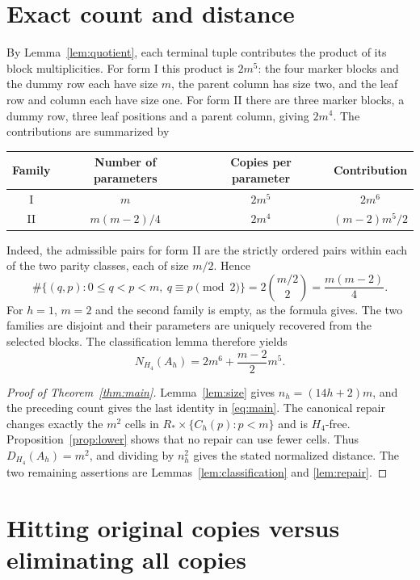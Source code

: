 \documentclass[11pt]{article}
\newcommand{\Copy}{N_{H_4}}
\begin{document}
\section{Exact count and distance}\label{sec:count}
By Lemma~\ref{lem:quotient}, each terminal tuple contributes the product of
its block multiplicities. For form I this product is $2m^5$: the four
marker blocks and the dummy row each have size $m$, the parent column has
size two, and the leaf row and column each have size one. For form II there
are three marker blocks, a dummy row, three leaf positions and a parent
column, giving $2m^4$. The contributions are summarized by
\begin{center}
\begin{tabular}{c|c|c|c}\toprule
Family&Number of parameters&Copies per parameter&Contribution\\\midrule
I&$m$&$2m^5$&$2m^6$\\
II&$m(m-2)/4$&$2m^4$&$(m-2)m^5/2$\\\bottomrule
\end{tabular}
\end{center}

Indeed, the admissible pairs for form II are the strictly ordered pairs
within each of the two parity classes, each of size $m/2$. Hence
\[
 \#\{(q,p):0\le q<p<m,\ q\equiv p\pmod2\}
 =2\binom{m/2}{2}=\frac{m(m-2)}4.
\]
For $h=1$, $m=2$ and the second family is empty, as the formula gives.
The two families are disjoint and their parameters are uniquely recovered
from the selected blocks. The classification lemma therefore yields
\[
 \Copy(A_h)=2m^6+\frac{m-2}{2}m^5.
\]

\begin{proof}[Proof of Theorem~\ref{thm:main}]
Lemma~\ref{lem:size} gives $n_h=(14h+2)m$, and the preceding count gives
the last identity in \eqref{eq:main}. The canonical repair changes exactly
the $m^2$ cells in
$R_*\times\{C_h(p):p<m\}$ and is $H_4$-free. Proposition~\ref{prop:lower}
shows that no repair can use fewer cells. Thus $D_{H_4}(A_h)=m^2$,
and dividing by $n_h^2$ gives the stated normalized distance. The two
remaining assertions are Lemmas~\ref{lem:classification} and
\ref{lem:repair}.
\end{proof}

\section{Hitting original copies versus eliminating all copies}\label{sec:hitting}


\appendix








\end{document}
